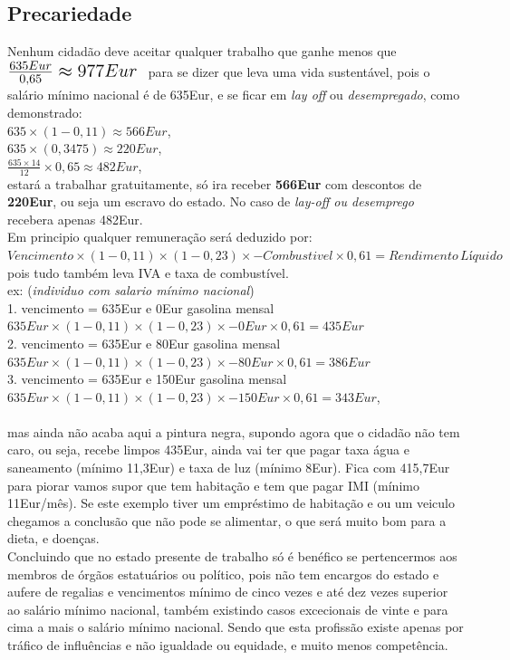 \subsection{Precariedade}
Nenhum cidadão deve aceitar qualquer trabalho que ganhe menos que \; $ \mbox{\Large $ \frac{635Eur}{0,65}\approx 977Eur $ } $ para se dizer que leva uma vida sustentável, pois o salário mínimo nacional é de 635Eur, e se ficar em \textit{lay off} ou \textit{desempregado}, como demonstrado:\\
$635\times(1-0,11)\approx566Eur$,\\
$635\times(0,3475)\approx220Eur$,\\
$\frac{635\times14}{12}\times0,65 \approx 482Eur$, \\
estará a trabalhar gratuitamente, só ira receber \textbf{566Eur} com descontos de \textbf{220Eur}, ou seja um escravo do estado. No caso de \textit{lay-off ou desemprego} recebera apenas 482Eur.\\
Em principio qualquer remuneração será deduzido por: $Vencimento \times (1-0,11) \times (1-0,23) \times - Combustivel\times 0,61 = Rendimento \, Líquido$ pois tudo também leva IVA e taxa de combustível.\\
ex: (\textit{individuo com salario mínimo nacional})\\
1. vencimento = 635Eur e 0Eur gasolina mensal \\
\hspace*{1cm} $635Eur \times (1-0,11) \times (1-0,23) \times - 0Eur \times 0,61 = 435Eur$ \\
2. vencimento = 635Eur e 80Eur gasolina mensal \\
\hspace*{1cm} $635Eur \times (1-0,11) \times (1-0,23) \times - 80Eur \times 0,61 = 386Eur$ \\
3. vencimento = 635Eur e 150Eur gasolina mensal \\
\hspace*{1cm} $635Eur \times (1-0,11) \times (1-0,23) \times - 150Eur \times 0,61 = 343Eur$, \\ \\
mas ainda não acaba aqui a pintura negra, supondo agora que o cidadão não tem caro, ou seja, recebe limpos 435Eur, ainda vai ter que pagar taxa água e saneamento (mínimo 11,3Eur) e taxa de luz (mínimo 8Eur). Fica com 415,7Eur para piorar vamos supor que tem habitação e tem que pagar IMI (mínimo 11Eur/mês).
Se este exemplo tiver um empréstimo de habitação e ou um veiculo chegamos a conclusão que não pode se alimentar, o que será muito bom para a dieta, e doenças.\\
\newpage
Concluindo que no estado presente de trabalho só é benéfico se pertencermos aos membros de órgãos estatuários ou político, pois não tem encargos do estado e aufere de regalias e vencimentos mínimo de cinco vezes e até dez vezes superior ao salário mínimo nacional, também existindo casos excecionais de vinte e para cima a mais o salário mínimo nacional. Sendo que esta profissão existe apenas por tráfico de influências e não igualdade ou equidade, e muito menos competência.
